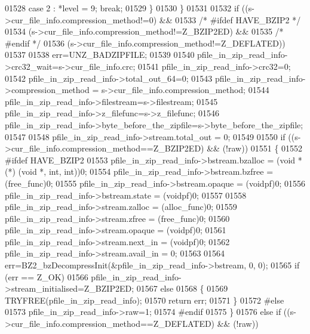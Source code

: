 \begin{DoxyCode}
01528           \textcolor{keywordflow}{case} 2 : *level = 9; \textcolor{keywordflow}{break};
01529         \}
01530     \}
01531 
01532     \textcolor{keywordflow}{if} ((s->cur\_file\_info.compression\_method!=0) &&
01533 \textcolor{comment}{/* #ifdef HAVE\_BZIP2 */}
01534         (s->cur\_file\_info.compression\_method!=Z\_BZIP2ED) &&
01535 \textcolor{comment}{/* #endif */}
01536         (s->cur\_file\_info.compression\_method!=Z\_DEFLATED))
01537 
01538         err=UNZ\_BADZIPFILE;
01539 
01540     pfile\_in\_zip\_read\_info->crc32\_wait=s->cur\_file\_info.crc;
01541     pfile\_in\_zip\_read\_info->crc32=0;
01542     pfile\_in\_zip\_read\_info->total\_out\_64=0;
01543     pfile\_in\_zip\_read\_info->compression\_method = s->cur\_file\_info.compression\_method;
01544     pfile\_in\_zip\_read\_info->filestream=s->filestream;
01545     pfile\_in\_zip\_read\_info->z\_filefunc=s->z\_filefunc;
01546     pfile\_in\_zip\_read\_info->byte\_before\_the\_zipfile=s->byte\_before\_the\_zipfile;
01547 
01548     pfile\_in\_zip\_read\_info->stream.total\_out = 0;
01549 
01550     \textcolor{keywordflow}{if} ((s->cur\_file\_info.compression\_method==Z\_BZIP2ED) && (!raw))
01551     \{
01552 \textcolor{preprocessor}{#ifdef HAVE\_BZIP2}
01553       pfile\_in\_zip\_read\_info->bstream.bzalloc = (\textcolor{keywordtype}{void} *(*) (\textcolor{keywordtype}{void} *, int, int))0;
01554       pfile\_in\_zip\_read\_info->bstream.bzfree = (free\_func)0;
01555       pfile\_in\_zip\_read\_info->bstream.opaque = (voidpf)0;
01556       pfile\_in\_zip\_read\_info->bstream.state = (voidpf)0;
01557 
01558       pfile\_in\_zip\_read\_info->stream.zalloc = (alloc\_func)0;
01559       pfile\_in\_zip\_read\_info->stream.zfree = (free\_func)0;
01560       pfile\_in\_zip\_read\_info->stream.opaque = (voidpf)0;
01561       pfile\_in\_zip\_read\_info->stream.next\_in = (voidpf)0;
01562       pfile\_in\_zip\_read\_info->stream.avail\_in = 0;
01563 
01564       err=BZ2\_bzDecompressInit(&pfile\_in\_zip\_read\_info->bstream, 0, 0);
01565       \textcolor{keywordflow}{if} (err == Z\_OK)
01566         pfile\_in\_zip\_read\_info->stream\_initialised=Z\_BZIP2ED;
01567       \textcolor{keywordflow}{else}
01568       \{
01569         TRYFREE(pfile\_in\_zip\_read\_info);
01570         \textcolor{keywordflow}{return} err;
01571       \}
01572 \textcolor{preprocessor}{#else}
01573       pfile\_in\_zip\_read\_info->raw=1;
01574 \textcolor{preprocessor}{#endif}
01575     \}
01576     \textcolor{keywordflow}{else} \textcolor{keywordflow}{if} ((s->cur\_file\_info.compression\_method==Z\_DEFLATED) && (!raw))

\end{DoxyCode}
